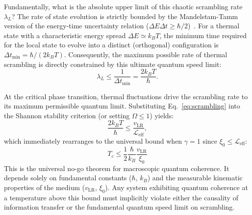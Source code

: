 \documentclass[11pt,a4paper]{article}
\begin{document}
Fundamentally, what is the absolute upper limit of this chaotic scrambling rate $\lambda_L$? The rate of state evolution is strictly bounded by the Mandelstam-Tamm version of the energy-time uncertainty relation ($\Delta E \Delta t \ge \hbar/2$)~\cite{MandelstamTamm1945,Busch2002}. For a thermal state with a characteristic energy spread $\Delta E \simeq k_B T$, the minimum time required for the local state to evolve into a distinct (orthogonal) configuration is $\Delta t_{\text{min}} = \hbar / (2k_B T)$. Consequently, the maximum possible rate of thermal scrambling is directly constrained by this ultimate quantum speed limit:
\begin{equation}
\lambda_L \le \frac{1}{\Delta t_{\text{min}}} = \frac{2k_B T}{\hbar}.
\label{eq:scrambling}
\end{equation}

At the critical phase transition, thermal fluctuations drive the scrambling rate to its maximum permissible quantum limit. Substituting Eq.~\eqref{eq:scrambling} into the Shannon stability criterion (or setting $\Omega \le 1$) yields:
\begin{equation}
\frac{2k_B T}{\hbar} \le \frac{v_{\text{LR}}}{\mathcal{L}_{\text{eff}}},
\label{eq:substitution}
\end{equation}
which immediately rearranges to the universal bound when $\gamma = 1$ since $\xi_0 \leq \mathcal{L}_{\text{eff}}$:
\begin{equation}
\boxed{ T_c \le \frac{1}{2}\frac{\hbar}{k_B}\frac{v_{\text{LR}}}{\xi_0}}
\label{eq:nogo}
\end{equation}
This is the universal no-go theorem for macroscopic quantum coherence. It depends solely on fundamental constants ($\hbar$, $k_B$) and the measurable kinematic properties of the medium ($v_{\text{LR}}$, $\xi_0$). Any system exhibiting quantum coherence at a temperature above this bound must implicitly violate either the causality of information transfer or the fundamental quantum speed limit on scrambling. 

\end{document}
